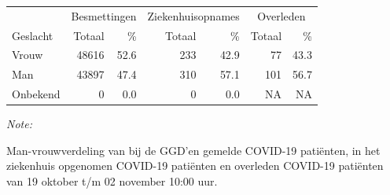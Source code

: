 \documentclass[
  english,
  man,floatsintext]{apa6}
\begin{document}
\begin{table}
\centering\begingroup\fontsize{11}{13}\selectfont

\begin{threeparttable}
\begin{tabular}{lrrrrrr}
\toprule
\multicolumn{1}{c}{ } & \multicolumn{2}{c}{Besmettingen} & \multicolumn{2}{c}{Ziekenhuisopnames} & \multicolumn{2}{c}{Overleden} \\
\cmidrule(l{3pt}r{3pt}){2-3} \cmidrule(l{3pt}r{3pt}){4-5} \cmidrule(l{3pt}r{3pt}){6-7}
Geslacht & Totaal & \% & Totaal & \% & Totaal & \%\\
\midrule
Vrouw & 48616 & 52.6 & 233 & 42.9 & 77 & 43.3\\
Man & 43897 & 47.4 & 310 & 57.1 & 101 & 56.7\\
Onbekend & 0 & 0.0 & 0 & 0.0 & NA & NA\\
\bottomrule
\end{tabular}
\begin{tablenotes}
\item \textit{Note: } 
\item Man-vrouwverdeling van bij de GGD’en gemelde COVID-19 patiënten, in het ziekenhuis opgenomen COVID-19 patiënten en overleden COVID-19 patiënten van 19 oktober t/m 02 november 10:00 uur.
\end{tablenotes}
\end{threeparttable}
\endgroup{}
\end{table}
\newpage
\end{document}
